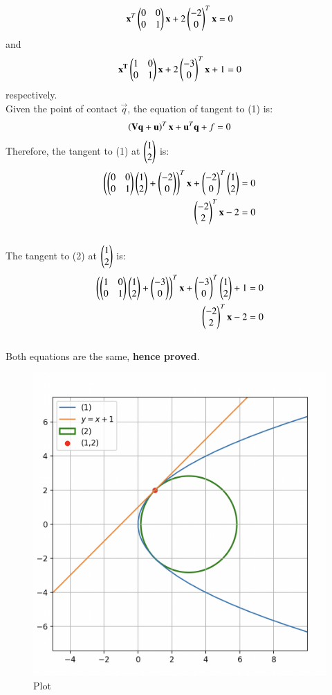 \documentclass[12pt]{article}
\begin{document}
\begin{align}
    \mathbf{x}^T\begin{pmatrix}0&0\\0&1\end{pmatrix}\mathbf{x} + 2\begin{pmatrix}-2\\0\end{pmatrix}^T\mathbf{x} = 0
\end{align}
and
\begin{align}
    \mathbf{x^T}\begin{pmatrix}1&0\\0&1\end{pmatrix}\mathbf{x} + 2\begin{pmatrix}-3\\0\end{pmatrix}^T\mathbf{x} + 1 = 0
\end{align}
respectively.\\
Given the point of contact $\vec{q}$, the equation of tangent to (1) is:
\begin{align}
    \left(\mathbf{Vq} + \mathbf{u}\right)^T\mathbf{x} + \mathbf{u}^T\mathbf{q} + f = 0
\end{align}
Therefore, the tangent to (1) at $\begin{pmatrix}1\\2\end{pmatrix}$ is:
\begin{align}
    \left(\begin{pmatrix}0&0\\0&1\end{pmatrix}\begin{pmatrix}1\\2\end{pmatrix} + \begin{pmatrix}-2\\0\end{pmatrix}\right)^T\mathbf{x} + \begin{pmatrix}-2\\0\end{pmatrix}^T\begin{pmatrix}1\\2\end{pmatrix} = 0\\
    \begin{pmatrix}-2\\2\end{pmatrix}^T\mathbf{x} - 2 = 0
\end{align}\\
The tangent to (2) at $\begin{pmatrix}1\\2\end{pmatrix}$ is:
\begin{align}
    \left(\begin{pmatrix}1&0\\0&1\end{pmatrix}\begin{pmatrix}1\\2\end{pmatrix} + \begin{pmatrix}-3\\0\end{pmatrix}\right)^T\mathbf{x} + \begin{pmatrix}-3\\0\end{pmatrix}^T\begin{pmatrix}1\\2\end{pmatrix} + 1 =0\\
    \begin{pmatrix}-2\\2\end{pmatrix}^T\mathbf{x} - 2 = 0
\end{align}\\
Both equations are the same, \textbf{hence proved}.

\begin{figure}[H]
    \centering
    \includegraphics[width=0.9\columnwidth]{Figs/1032.png}
    \caption{Plot}
    \label{fig:placeholder}
\end{figure}
\end{document}
